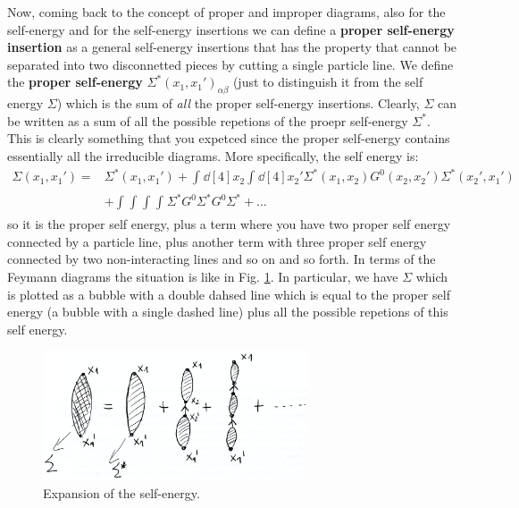 \documentclass[../main/main.tex]{subfiles}
\begin{document}
Now, coming back  to the concept of proper and improper diagrams, also for the self-energy and for the self-energy insertions we can define a \textbf{ proper self-energy insertion} as a general  self-energy insertions that has the property that cannot be separated into two disconnetted pieces by cutting a single particle line.  We define the \textbf{proper self-energy} \( \Sigma^*  (x_1,x_1')_{\alpha \beta }\) (just to distinguish it from the self energy \( \Sigma  \)) which is the sum of \emph{all} the proper self-energy insertions.
Clearly, \( \Sigma  \) can be written as a sum of all the possible repetions of the proepr self-energy \( \Sigma ^* \). This is clearly something that you expetced since the proper self-energy contains essentially all the irreducible diagrams. More specifically, the self energy is:
\begin{equation}
\begin{split}
    \Sigma (x_1,x_1') = & \Sigma^* (x_1,x_1')
    + \int_{}^{} \dd[4]{x_2} \int_{}^{} \dd[4]{x_2'} \Sigma^* (x_1,x_2)
    G^0 (x_2,x_2') \Sigma ^* (x_2',x_1')
    \\
    &+ \int_{}^{}  \int_{}^{} \int_{}^{} \int_{}^{} \Sigma ^* G^0 \Sigma ^*  G^0 \Sigma ^* + \dots
\end{split}
\end{equation}
so it is the proper self energy, plus a term where you have two proper self energy connected by a particle line, plus another term with three proper self energy connected by two non-interacting lines and so on and so forth.
In terms of the Feymann diagrams the situation is like in Fig. \ref{fig:15_5}. In particular, we have \( \Sigma  \) which is plotted as a bubble with a double dahsed line which is equal to the proper self energy (a bubble with a single dashed line) plus all the possible repetions of this self energy.

\begin{figure}[h!]
\centering
\includegraphics[width=0.7\textwidth]{../lessons/15_image/3.png}
\caption{\label{fig:15_5} Expansion of the self-energy.}
\end{figure}
\end{document}
